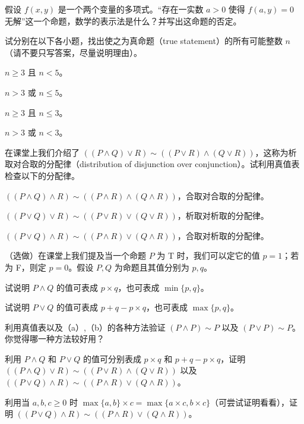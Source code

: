 \begin{question}
假设 \(f(x, y)\) 是一个两个变量的多项式。“存在一实数 \(a > 0\) 使得 \(f(a, y) = 0\) 无解”这一个命题，数学的表示法是什么？并写出这命题的否定。
\end{question}

\begin{problemset}
    \item 试分别在以下各小题，找出使之为真命题（true statement）的所有可能整数 $n$（请不要只写答案，尽量说明理由）。
    \begin{probenumerate}
        \item $n \geq 3$ 且 $n < 5$。
        \item $n > 3$ 或 $n \leq 5$。
        \item $n \geq 3$ 且 $n \leq 3$。
        \item $n > 3$ 或 $n < 3$。
    \end{probenumerate}

    \item 在课堂上我们介绍了 $((P \wedge Q) \vee R) \sim ((P \vee R) \wedge (Q \vee R))$，这称为析取对合取的分配律（distribution of disjunction over conjunction）。试利用真值表检查以下的分配律。
    \begin{probenumerate}
        \item $((P \wedge Q) \wedge R) \sim ((P \wedge R) \wedge (Q \wedge R))$，合取对合取的分配律。
        \item $((P \vee Q) \vee R) \sim ((P \vee R) \vee (Q \vee R))$，析取对析取的分配律。
        \item $((P \vee Q) \wedge R) \sim ((P \wedge R) \vee (Q \wedge R))$，合取对析取的分配律。
    \end{probenumerate}

    \item（选做）在课堂上我们提及当一个命题 $P$ 为 T 时，我们可以定它的值 $p = 1$；若为 F，则定 $p = 0$。假设 $P, Q$ 为命题且其值分别为 $p, q$。
    \begin{probenumerate}
        \item 试说明 $P \wedge Q$ 的值可表成 $p \times q$，也可表成 $\min\{p, q\}$。
        \item 试说明 $P \vee Q$ 的值可表成 $p + q - p \times q$，也可表成 $\max\{p, q\}$。
        \item 利用真值表以及（a）,（b）的各种方法验证 $(P \wedge P) \sim P$ 以及 $(P \vee P) \sim P$。你觉得哪一种方法较好用？
        \item 利用 $P \wedge Q$ 和 $P \vee Q$ 的值可分别表成 $p \times q$ 和 $p + q - p \times q$，证明 $((P \wedge Q) \vee R) \sim ((P \vee R) \wedge (Q \vee R))$ 以及 $((P \vee Q) \wedge R) \sim ((P \wedge R) \vee (Q \wedge R))$。
        \item 利用当 $a, b, c \geq 0$ 时 $\max\{a, b\} \times c = \max\{a \times c, b \times c\}$（可尝试证明看看），证明 $((P \vee Q) \wedge R) \sim ((P \wedge R) \vee (Q \wedge R))$。
    \end{probenumerate}


\end{problemset}
